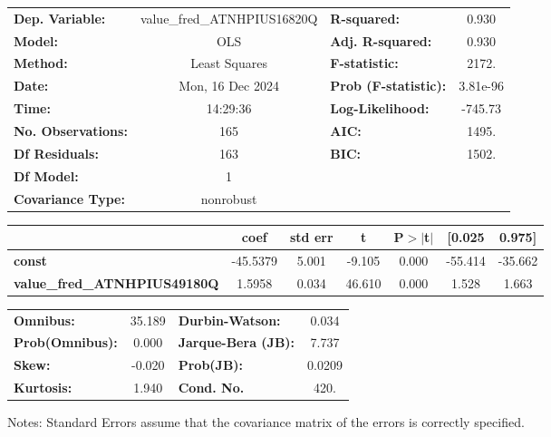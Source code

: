\begin{center}
\begin{tabular}{lclc}
\toprule
\textbf{Dep. Variable:}              & value\_fred\_ATNHPIUS16820Q & \textbf{  R-squared:         } &     0.930   \\
\textbf{Model:}                      &             OLS             & \textbf{  Adj. R-squared:    } &     0.930   \\
\textbf{Method:}                     &        Least Squares        & \textbf{  F-statistic:       } &     2172.   \\
\textbf{Date:}                       &       Mon, 16 Dec 2024      & \textbf{  Prob (F-statistic):} &  3.81e-96   \\
\textbf{Time:}                       &           14:29:36          & \textbf{  Log-Likelihood:    } &   -745.73   \\
\textbf{No. Observations:}           &               165           & \textbf{  AIC:               } &     1495.   \\
\textbf{Df Residuals:}               &               163           & \textbf{  BIC:               } &     1502.   \\
\textbf{Df Model:}                   &                 1           & \textbf{                     } &             \\
\textbf{Covariance Type:}            &          nonrobust          & \textbf{                     } &             \\
\bottomrule
\end{tabular}
\begin{tabular}{lcccccc}
                                     & \textbf{coef} & \textbf{std err} & \textbf{t} & \textbf{P$> |$t$|$} & \textbf{[0.025} & \textbf{0.975]}  \\
\midrule
\textbf{const}                       &     -45.5379  &        5.001     &    -9.105  &         0.000        &      -55.414    &      -35.662     \\
\textbf{value\_fred\_ATNHPIUS49180Q} &       1.5958  &        0.034     &    46.610  &         0.000        &        1.528    &        1.663     \\
\bottomrule
\end{tabular}
\begin{tabular}{lclc}
\textbf{Omnibus:}       & 35.189 & \textbf{  Durbin-Watson:     } &    0.034  \\
\textbf{Prob(Omnibus):} &  0.000 & \textbf{  Jarque-Bera (JB):  } &    7.737  \\
\textbf{Skew:}          & -0.020 & \textbf{  Prob(JB):          } &   0.0209  \\
\textbf{Kurtosis:}      &  1.940 & \textbf{  Cond. No.          } &     420.  \\
\bottomrule
\end{tabular}
\end{center}

Notes: \newline
 [1] Standard Errors assume that the covariance matrix of the errors is correctly specified.